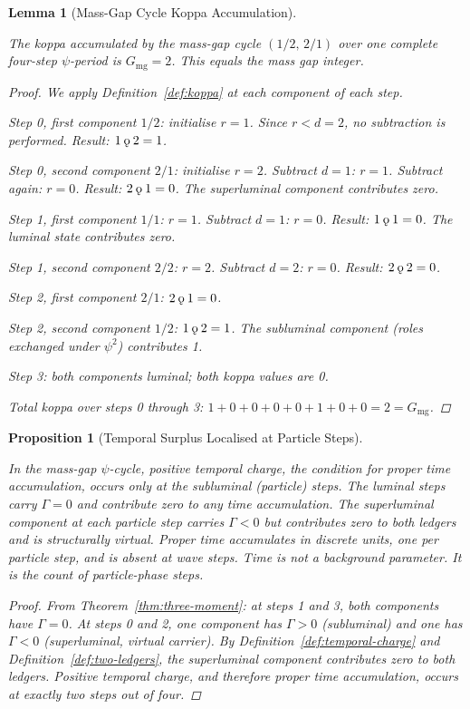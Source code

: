 \documentclass[11pt, letterpaper]{article}
\newcommand{\koppa}{\mathbin{\text{\rm\k{o}}}}
\newcommand{\Tcharge}{\Gamma}
\theoremstyle{definition}
\theoremstyle{plain}
\newtheorem{lemma}{Lemma}[section]
\newtheorem{proposition}{Proposition}[section]
\begin{document}
\begin{lemma}[Mass-Gap Cycle Koppa Accumulation]\label{lem:koppa-cycle}
\begin{rsbox}
The koppa accumulated by the mass-gap cycle $(1/2,\, 2/1)$ over one complete
four-step $\psi$-period is $G_{\mathrm{mg}} = 2$.  This equals the mass gap integer.
\end{rsbox}
\begin{proof}
We apply Definition~\ref{def:koppa} at each component of each step.

Step 0, first component $1/2$: initialise $r = 1$.  Since $r < d = 2$, no
subtraction is performed.  Result: $1 \koppa 2 = 1$.

Step 0, second component $2/1$: initialise $r = 2$.  Subtract $d = 1$: $r = 1$.
Subtract again: $r = 0$.  Result: $2 \koppa 1 = 0$.  The superluminal component
contributes zero.

Step 1, first component $1/1$: $r = 1$.  Subtract $d = 1$: $r = 0$.  Result:
$1 \koppa 1 = 0$.  The luminal state contributes zero.

Step 1, second component $2/2$: $r = 2$.  Subtract $d = 2$: $r = 0$.  Result:
$2 \koppa 2 = 0$.

Step 2, first component $2/1$: $2 \koppa 1 = 0$.

Step 2, second component $1/2$: $1 \koppa 2 = 1$.  The subluminal component
(roles exchanged under $\psi^2$) contributes 1.

Step 3: both components luminal; both koppa values are 0.

Total koppa over steps 0 through 3: $1 + 0 + 0 + 0 + 0 + 1 + 0 + 0 = 2 =
G_{\mathrm{mg}}$.
\end{proof}
\end{lemma}

\begin{proposition}[Temporal Surplus Localised at Particle Steps]\label{prop:time}
\begin{rsbox}
In the mass-gap $\psi$-cycle, positive temporal charge, the condition for
proper time accumulation, occurs only at the subluminal (particle) steps.
The luminal steps carry $\Tcharge = 0$ and contribute zero to any time
accumulation.  The superluminal component at each particle step carries
$\Tcharge < 0$ but contributes zero to both ledgers and is structurally virtual.
Proper time accumulates in discrete units, one per particle step, and is absent
at wave steps.  Time is not a background parameter.  It is the count of
particle-phase steps.
\end{rsbox}
\begin{proof}
From Theorem~\ref{thm:three-moment}: at steps 1 and 3, both components have
$\Tcharge = 0$.  At steps 0 and 2, one component has $\Tcharge > 0$ (subluminal)
and one has $\Tcharge < 0$ (superluminal, virtual carrier).  By
Definition~\ref{def:temporal-charge} and Definition~\ref{def:two-ledgers}, the
superluminal component contributes zero to both ledgers.  Positive temporal
charge, and therefore proper time accumulation, occurs at exactly two steps
out of four.
\end{proof}
\end{proposition}
\end{document}
